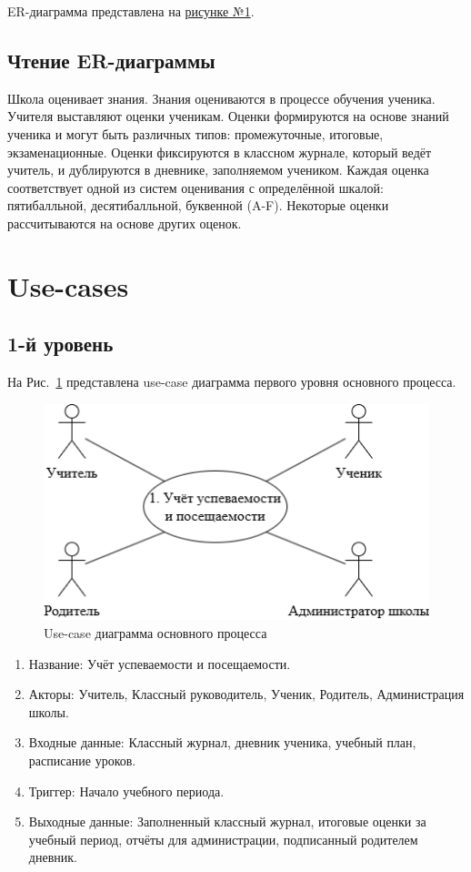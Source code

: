 \documentclass[a4paper, final]{article}
\begin{document}
ER-диаграмма представлена на \hyperlink{diag:er}{рисунке №1}.

\newpage
\hypertarget{diag:er}{}

\addtocounter{figure}{1}
\newpage

\subsection{Чтение ER-диаграммы}
Школа оценивает знания. Знания оцениваются в процессе обучения ученика. Учителя выставляют оценки ученикам. Оценки формируются на основе знаний ученика и могут быть различных типов: промежуточные, итоговые, экзаменационные. Оценки фиксируются в классном журнале, который ведёт учитель, и дублируются в дневнике, заполняемом учеником. Каждая оценка соответствует одной из систем оценивания с определённой шкалой: пятибалльной, десятибалльной, буквенной (A-F). Некоторые оценки рассчитываются на основе других оценок.

\newpage
\section{Use-cases}
\subsection{1-й уровень}
На Рис.~\ref{img:use_case1} представлена use-case диаграмма первого уровня основного процесса.

\begin{figure}[H]
   \centering
   \includegraphics[width=0.7\linewidth]{use_case1.png}
   \caption{Use-case диаграмма основного процесса}
   \label{img:use_case1}
\end{figure}

\begin{enumerate}
  \item Название: Учёт успеваемости и посещаемости.
  \item Акторы: Учитель, Классный руководитель, Ученик, Родитель, Администрация школы.
  \item Входные данные: Классный журнал, дневник ученика, учебный план, расписание уроков.
  \item Триггер: Начало учебного периода.
  \item Выходные данные: Заполненный классный журнал, итоговые оценки за учебный период, отчёты для администрации, подписанный родителем дневник.
\end{enumerate}
\end{document}
